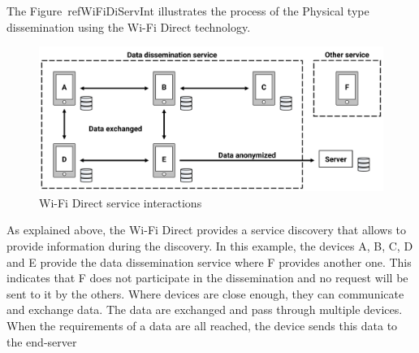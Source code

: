 The Figure~ref{WiFiDiServInt} illustrates the process of the Physical type dissemination using the Wi-Fi Direct technology.

\begin{figure}[h]
	\centering
	\includegraphics[width=\textwidth]{figures/wifidirect}
	\caption{\label{WiFiDiServInt} Wi-Fi Direct service interactions}
\end{figure}

As explained above, the Wi-Fi Direct provides a service discovery that allows to provide information during the discovery. 
In this example, the devices A, B, C, D and E provide the data dissemination service where F provides another one.
This indicates that F does not participate in the dissemination and no request will be sent to it by the others.
Where devices are close enough, they can communicate and exchange data.
The data are exchanged and pass through multiple devices.
When the requirements of a data are all reached, the device sends this data to the end-server 

